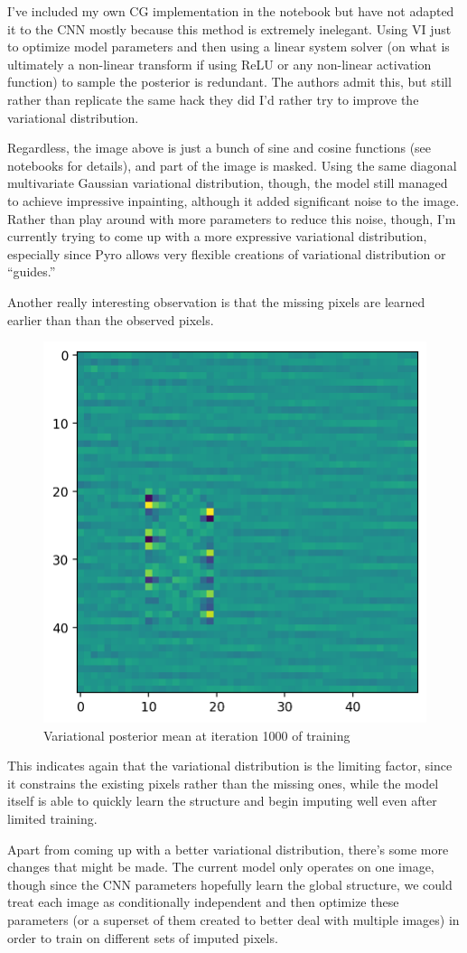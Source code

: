 \documentclass{article}
\begin{document}
I've included my own CG implementation in the notebook but have not adapted it
to the CNN mostly because this method is extremely inelegant. Using VI just to optimize
model parameters and then using a linear system solver (on what is ultimately
a non-linear transform if using ReLU or any non-linear activation function) to
sample the posterior is redundant. The authors admit this, but still rather than
replicate the same hack they did I'd rather try to improve the variational distribution.

Regardless, the image above is just a bunch of sine and cosine functions (see
notebooks for details), and part of the image is masked. Using the same diagonal
multivariate Gaussian variational distribution, though, the model still managed
to achieve impressive inpainting, although it added significant noise to the image.
Rather than play around with more parameters to reduce this noise, though, I'm
currently trying to come up with a more expressive variational distribution, especially
since Pyro allows very flexible creations of variational distribution or ``guides.''

Another really interesting observation is that the missing pixels are learned
earlier than than the observed pixels.
\begin{figure}[H]
	\begin{center}
		\includegraphics[width=0.5\linewidth]{images/iter1000.png}
	\end{center}
	\caption{Variational posterior mean at iteration 1000 of training}
\end{figure}
This indicates again that the variational distribution is the limiting factor,
since it constrains the existing pixels rather than the missing ones, while the model
itself
is able to quickly learn the structure and begin imputing well even after limited
training.

Apart from coming up with a better variational distribution, there's some more
changes that might be made. The current model only operates on one image, though
since the CNN parameters hopefully learn the global structure, we could treat
each image as conditionally independent and then optimize these parameters (or
a superset of them created to better deal with multiple images) in order to
train on different sets of imputed pixels.
\end{document}
